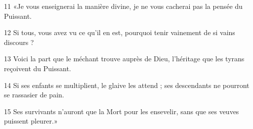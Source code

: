 
11 «Je vous enseignerai la manière divine, je ne vous cacherai pas la pensée du Puissant.

12 Si tous, vous avez vu ce qu’il en est, pourquoi tenir vainement de si vains discours ?

13 Voici la part que le méchant trouve auprès de Dieu, l’héritage que les tyrans reçoivent du Puissant.

14 Si ses enfants se multiplient, le glaive les attend ; ses descendants ne pourront se rassasier de pain.

15 Ses survivants n’auront que la Mort pour les ensevelir, sans que ses veuves puissent pleurer.»